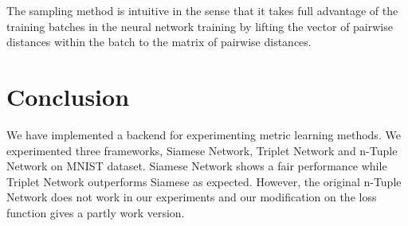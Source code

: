 \documentclass[10pt,twocolumn,letterpaper]{article}
\begin{document}
	The sampling method is intuitive in the sense that it takes full advantage of the training batches in the neural network training by lifting the vector of pairwise distances within the batch to the matrix of pairwise distances. 
	\section{Conclusion \label{sec:Conc}}
		We have implemented a backend for experimenting metric learning methods. We experimented three frameworks, Siamese Network, Triplet Network and n-Tuple Network on MNIST dataset. Siamese Network shows a fair performance while Triplet Network outperforms Siamese as expected. However, the original n-Tuple Network does not work in our experiments and our modification on the loss function gives a partly work version.
	{\small
		
		
	}
	
\end{document}
